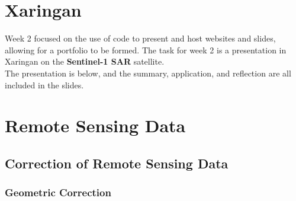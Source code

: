 \documentclass[
  letterpaper,
]{scrbook}
\begin{document}

\chapter{Xaringan}\label{xaringan}

Week 2 focused on the use of code to present and host websites and
slides, allowing for a portfolio to be formed. The task for week 2 is a
presentation in Xaringan on the \textbf{Sentinel-1 SAR} satellite.\\
The presentation is below, and the summary, application, and reflection
are all included in the slides.


\chapter{Remote Sensing Data}\label{remote-sensing-data}

\section{Correction of Remote Sensing
Data}\label{correction-of-remote-sensing-data}

\subsection{Geometric Correction}\label{geometric-correction}
\end{document}
